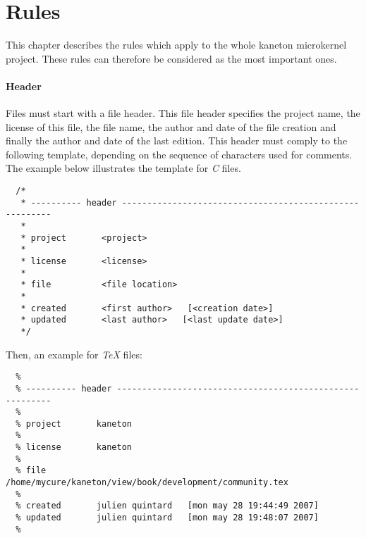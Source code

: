 %
%
%
%
%
%

%
%

\chapter{Rules}
\label{chapter:rules}

This chapter describes the rules which apply to the whole kaneton microkernel
project. These rules can therefore be considered as the most important ones.

\newpage

%
%


\subsubsection{Header}

Files must start with a file header. This file header specifies the
project name, the license of this file, the file name, the author and
date of the file creation and finally the author and date of the last
edition. This header must comply to the following template, depending
on the sequence of characters used for comments. The example below illustrates
the template for \textit{C} files.

\begin{verbatim}
  /*
   * ---------- header --------------------------------------------------------
   *
   * project       <project>
   *
   * license       <license>
   *
   * file          <file location>
   *
   * created       <first author>   [<creation date>]
   * updated       <last author>   [<last update date>]
   */
\end{verbatim}

Then, an example for \textit{TeX} files:

\begin{verbatim}
  %
  % ---------- header ---------------------------------------------------------
  %
  % project       kaneton
  %
  % license       kaneton
  %
  % file          /home/mycure/kaneton/view/book/development/community.tex
  %
  % created       julien quintard   [mon may 28 19:44:49 2007]
  % updated       julien quintard   [mon may 28 19:48:07 2007]
  %
\end{verbatim}


